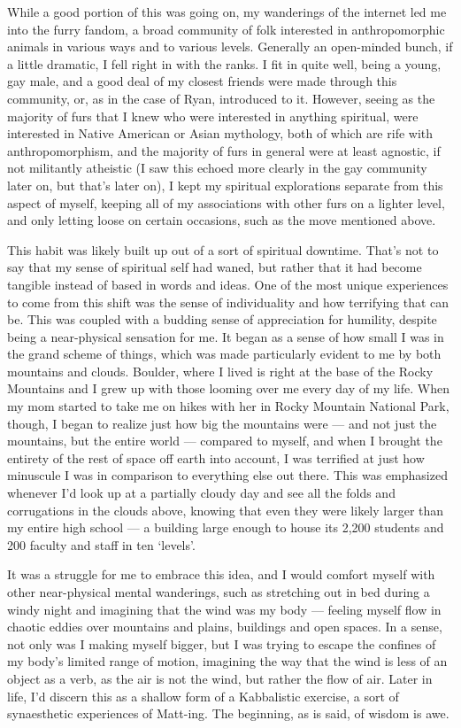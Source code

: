 \documentclass{book}
\begin{document}
While a good portion of this was going on, my wanderings of the internet led me into the furry fandom, a broad community of folk interested in anthropomorphic animals in various ways and to various levels.  Generally an open-minded bunch, if a little dramatic, I fell right in with the ranks.  I fit in quite well, being a young, gay male, and a good deal of my closest friends were made through this community, or, as in the case of Ryan, introduced to it.  However, seeing as the majority of furs that I knew who were interested in anything spiritual, were interested in Native American or Asian mythology, both of which are rife with anthropomorphism, and the majority of furs in general were at least agnostic, if not militantly atheistic (I saw this echoed more clearly in the gay community later on, but that's later on), I kept my spiritual explorations separate from this aspect of myself, keeping all of my associations with other furs on a lighter level, and only letting loose on certain occasions, such as the move mentioned above.

This habit was likely built up out of a sort of spiritual downtime.  That's not to say that my sense of spiritual self had waned, but rather that it had become tangible instead of based in words and ideas.  One of the most unique experiences to come from this shift was the sense of individuality and how terrifying that can be.  This was coupled with a budding sense of appreciation for humility, despite being a near-physical sensation for me.  It began as a sense of how small I was in the grand scheme of things, which was made particularly evident to me by both mountains and clouds.  Boulder, where I lived is right at the base of the Rocky Mountains and I grew up with those looming over me every day of my life.  When my mom started to take me on hikes with her in Rocky Mountain National Park, though, I began to realize just how big the mountains were --- and not just the mountains, but the entire world --- compared to myself, and when I brought the entirety of the rest of space off earth into account, I was terrified at just how minuscule I was in comparison to everything else out there.  This was emphasized whenever I'd look up at a partially cloudy day and see all the folds and corrugations in the clouds above, knowing that even they were likely larger than my entire high school --- a building large enough to house its 2,200 students and 200 faculty and staff in ten `levels'.

It was a struggle for me to embrace this idea, and I would comfort myself with other near-physical mental wanderings, such as stretching out in bed during a windy night and imagining that the wind was my body --- feeling myself flow in chaotic eddies over mountains and plains, buildings and open spaces.  In a sense, not only was I making myself bigger, but I was trying to escape the confines of my body's limited range of motion, imagining the way that the wind is less of an object as a verb, as the air is not the wind, but rather the flow of air.  Later in life, I'd discern this as a shallow form of a Kabbalistic exercise, a sort of synaesthetic experiences of Matt-ing.  The beginning, as is said, of wisdom is awe.
\end{document}
